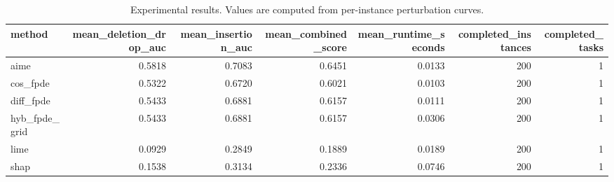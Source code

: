 \begin{table}[t]
\caption{Experimental results. Values are computed from per-instance perturbation curves.}
\label{tab:main_results_computed}
\centering
\begin{tabular}{lrrrrrr}
\toprule
method & mean\_deletion\_drop\_auc & mean\_insertion\_auc & mean\_combined\_score & mean\_runtime\_seconds & completed\_instances & completed\_tasks \\
\midrule
aime & 0.5818 & 0.7083 & 0.6451 & 0.0133 & 200 & 1 \\
cos\_fpde & 0.5322 & 0.6720 & 0.6021 & 0.0103 & 200 & 1 \\
diff\_fpde & 0.5433 & 0.6881 & 0.6157 & 0.0111 & 200 & 1 \\
hyb\_fpde\_grid & 0.5433 & 0.6881 & 0.6157 & 0.0306 & 200 & 1 \\
lime & 0.0929 & 0.2849 & 0.1889 & 0.0189 & 200 & 1 \\
shap & 0.1538 & 0.3134 & 0.2336 & 0.0746 & 200 & 1 \\
\bottomrule
\end{tabular}

\end{table}
